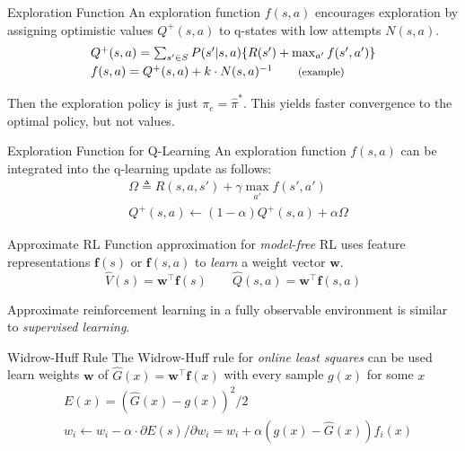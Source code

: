 \documentclass{cognito}
\begin{document}
\begin{note}{Exploration Function}
	An exploration function $f(s, a)$ encourages exploration by
	assigning optimistic values $Q^+(s,a)$ to q-states with low attempts $N(s,a)$.
	\begin{align*}
		& \textstyle Q^+(s,a) = \sum_{s' \in S} P(s' | s, a) \{ R(s') + \max_{a'} f(s', a') \} \\
		& \textstyle f(s,a) = Q^+(s,a) + k \cdot N(s,a)^{-1} \quad\quad \text{\footnotesize(example)}
	\end{align*}
	\begin{remark} Then the exploration policy is just $\pi_e = \hat{\pi}^*$.
		This yields faster convergence to the optimal policy, but not values.
	\end{remark}\vspace{-5pt}
\end{note}

\begin{note}{Exploration Function for Q-Learning}
	An exploration function $f(s, a)$ can be integrated into the q-learning update
	as follows:
	\begin{align*}
		&\textstyle \Omega \triangleq R(s, a, s') + \gamma \max_{a'} f(s',a')\\
		&\textstyle Q^+(s,a) \leftarrow (1 - \alpha) Q^+(s,a) + \alpha \Omega 
	\end{align*}
	\vspace{-10pt}
\end{note}



\begin{note}{Approximate RL}
	Function approximation for \emph{model-free} RL uses feature representations $\mathbf{f}(s)$
	or $\mathbf{f}(s,a)$ to \emph{learn} a weight vector $\mathbf{w}$.
	$$ \hat{V}(s) = \mathbf{w}^\top \mathbf{f}(s) \quad\quad \hat{Q}(s,a) =  \mathbf{w}^\top \mathbf{f}(s,a) $$
	\begin{remark} Approximate reinforcement learning in a fully observable environment is similar to \emph{supervised learning}.
	\end{remark}
	\vspace{-5pt}
\end{note}

\begin{note}{Widrow-Huff Rule}
	The Widrow-Huff rule for \emph{online least squares} can be used learn weights $\mathbf{w}$ of $\hat{G}(x) = \mathbf{w}^\top \mathbf{f}(x)$
	with every sample $g(x)$ for some $x$
	\begin{align*}
		& \textstyle E(x) =(\hat{G}(x) - g(x))^2 / 2\\
		& \textstyle w_i \leftarrow w_i - \alpha \cdot \partial E(s)/\partial w_i = w_i + \alpha (g(x) - \hat{G}(x)) f_i(x)
	\end{align*}
	\vspace{-10pt}
\end{note}
\end{document}
